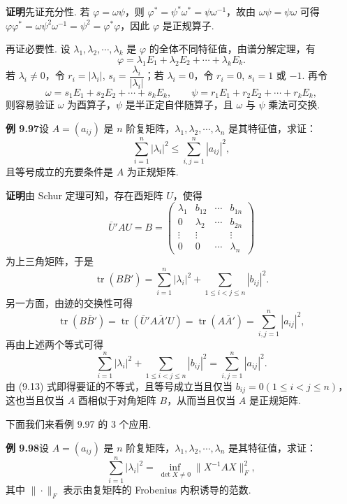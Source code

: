 \documentclass[UTF8,12pt,a4paper,fontset=fandol]{ctexart}
\begin{document}
\noindent\textbf{证明}\quad 先证充分性. 若 $\varphi=\omega\psi$，则 $\varphi^*=\psi^*\omega^*=\psi\omega^{-1}$，故由 $\omega\psi=\psi\omega$ 可得 $\varphi\varphi^*=\omega\psi^2\omega^{-1}=\psi^2=\varphi^*\varphi$，因此 $\varphi$ 是正规算子.

再证必要性. 设 $\lambda_1,\lambda_2,\cdots,\lambda_k$ 是 $\varphi$ 的全体不同特征值，由谱分解定理，有
\[
\varphi=\lambda_1E_1+\lambda_2E_2+\cdots+\lambda_kE_k.
\]
若 $\lambda_i\ne0$，令 $r_i=|\lambda_i|$, $s_i=\dfrac{\lambda_i}{|\lambda_i|}$；若 $\lambda_i=0$，令 $r_i=0$, $s_i=1$ 或 $-1$. 再令
\[
\omega=s_1E_1+s_2E_2+\cdots+s_kE_k,\qquad
\psi=r_1E_1+r_2E_2+\cdots+r_kE_k,
\]
则容易验证 $\omega$ 为酉算子，$\psi$ 是半正定自伴随算子，且 $\omega$ 与 $\psi$ 乘法可交换.

\noindent\textbf{例 9.97}\quad 设 $A=(a_{ij})$ 是 $n$ 阶复矩阵，$\lambda_1,\lambda_2,\cdots,\lambda_n$ 是其特征值，求证：
\[
\sum_{i=1}^n|\lambda_i|^2\le\sum_{i,j=1}^n|a_{ij}|^2,
\]
且等号成立的充要条件是 $A$ 为正规矩阵.

\noindent\textbf{证明}\quad 由 Schur 定理可知，存在酉矩阵 $U$，使得
\[
\overline{U}'AU=B=
\begin{pmatrix}
\lambda_1&b_{12}&\cdots&b_{1n}\\
0&\lambda_2&\cdots&b_{2n}\\
\vdots&\vdots&&\vdots\\
0&0&\cdots&\lambda_n
\end{pmatrix}
\]
为上三角矩阵，于是
\[
\operatorname{tr}(B\overline{B}')=\sum_{i=1}^n|\lambda_i|^2+\sum_{1\le i<j\le n}|b_{ij}|^2.
\]
另一方面，由迹的交换性可得
\[
\operatorname{tr}(B\overline{B}')=\operatorname{tr}(\overline{U}'A\overline{A}'U)=\operatorname{tr}(A\overline{A}')=\sum_{i,j=1}^n|a_{ij}|^2,
\]
再由上述两个等式可得
\begin{equation}
\sum_{i=1}^n|\lambda_i|^2+\sum_{1\le i<j\le n}|b_{ij}|^2=\sum_{i,j=1}^n|a_{ij}|^2.
\tag{9.13}
\end{equation}
由 (9.13) 式即得要证的不等式，且等号成立当且仅当 $b_{ij}=0(1\le i<j\le n)$，这也当且仅当 $A$ 酉相似于对角矩阵 $B$，从而当且仅当 $A$ 是正规矩阵.

下面我们来看例 9.97 的 3 个应用.

\noindent\textbf{例 9.98}\quad 设 $A=(a_{ij})$ 是 $n$ 阶复矩阵，$\lambda_1,\lambda_2,\cdots,\lambda_n$ 是其特征值，求证：
\[
\sum_{i=1}^n|\lambda_i|^2=\inf_{\det X\ne0}\|X^{-1}AX\|_F^2,
\]
其中 $\|\cdot\|_F$ 表示由复矩阵的 Frobenius 内积诱导的范数.
\end{document}
